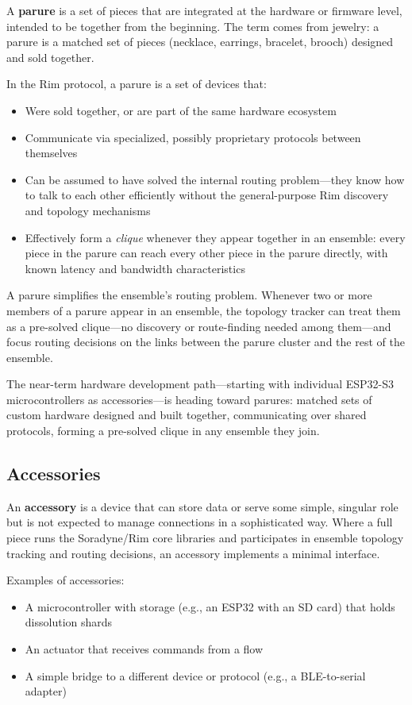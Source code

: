 \documentclass[11pt, letterpaper]{article}
\begin{document}
A \textbf{parure} is a set of pieces that are integrated at the hardware or firmware
level, intended to be together from the beginning. The term comes from jewelry: a parure
is a matched set of pieces (necklace, earrings, bracelet, brooch) designed and sold
together.

In the Rim protocol, a parure is a set of devices that:

\begin{itemize}[leftmargin=2em]
  \item Were sold together, or are part of the same hardware ecosystem
  \item Communicate via specialized, possibly proprietary protocols between themselves
  \item Can be assumed to have solved the internal routing problem---they know how to
    talk to each other efficiently without the general-purpose Rim discovery and topology
    mechanisms
  \item Effectively form a \emph{clique} whenever they appear together in an ensemble:
    every piece in the parure can reach every other piece in the parure directly, with
    known latency and bandwidth characteristics
\end{itemize}

A parure simplifies the ensemble's routing problem. Whenever two or more members of a
parure appear in an ensemble, the topology tracker can treat them as a pre-solved
clique---no discovery or route-finding needed among them---and focus routing decisions
on the links between the parure cluster and the rest of the ensemble.

The near-term hardware development path---starting with individual ESP32-S3
microcontrollers as accessories---is heading toward parures: matched sets of custom
hardware designed and built together, communicating over shared protocols, forming a
pre-solved clique in any ensemble they join.

\subsection{Accessories}

An \textbf{accessory} is a device that can store data or serve some simple, singular role
but is not expected to manage connections in a sophisticated way. Where a full piece runs
the Soradyne/Rim core libraries and participates in ensemble topology tracking and
routing decisions, an accessory implements a minimal interface.

Examples of accessories:
\begin{itemize}[leftmargin=2em]
  \item A microcontroller with storage (e.g., an ESP32 with an SD card) that holds
    dissolution shards
  \item An actuator that receives commands from a flow
  \item A simple bridge to a different device or protocol (e.g., a BLE-to-serial adapter)
\end{itemize}
\end{document}
